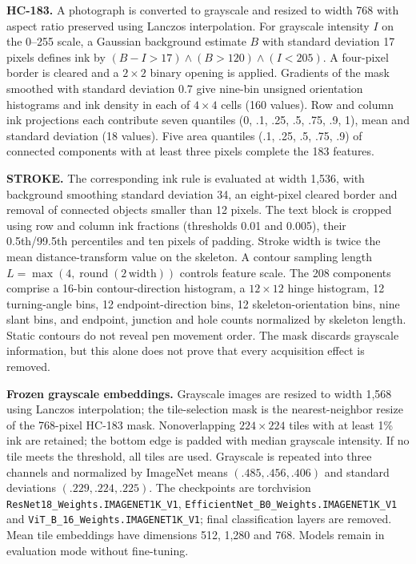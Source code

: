 \documentclass[ASNA,twocolumn]{USG}
\begin{document}
\textbf{HC-183.} A photograph is converted to grayscale and resized to width 768 with aspect ratio preserved using Lanczos interpolation. For grayscale intensity $I$ on the 0--255 scale, a Gaussian background estimate $B$ with standard deviation 17 pixels defines ink by $(B-I>17)\land(B>120)\land(I<205)$. A four-pixel border is cleared and a $2\times2$ binary opening is applied. Gradients of the mask smoothed with standard deviation 0.7 give nine-bin unsigned orientation histograms and ink density in each of $4\times4$ cells (160 values). Row and column ink projections each contribute seven quantiles (0, .1, .25, .5, .75, .9, 1), mean and standard deviation (18 values). Five area quantiles (.1, .25, .5, .75, .9) of connected components with at least three pixels complete the 183 features.

\textbf{STROKE.} The corresponding ink rule is evaluated at width 1,536, with background smoothing standard deviation 34, an eight-pixel cleared border and removal of connected objects smaller than 12 pixels. The text block is cropped using row and column ink fractions (thresholds 0.01 and 0.005), their 0.5th/99.5th percentiles and ten pixels of padding. Stroke width is twice the mean distance-transform value on the skeleton. A contour sampling length $L=\max(4,\operatorname{round}(2\,\mathrm{width}))$ controls feature scale. The 208 components comprise a 16-bin contour-direction histogram, a $12\times12$ hinge histogram, 12 turning-angle bins, 12 endpoint-direction bins, 12 skeleton-orientation bins, nine slant bins, and endpoint, junction and hole counts normalized by skeleton length. Static contours do not reveal pen movement order. The mask discards grayscale information, but this alone does not prove that every acquisition effect is removed.

\textbf{Frozen grayscale embeddings.} Grayscale images are resized to width 1,568 using Lanczos interpolation; the tile-selection mask is the nearest-neighbor resize of the 768-pixel HC-183 mask. Nonoverlapping $224\times224$ tiles with at least 1\% ink are retained; the bottom edge is padded with median grayscale intensity. If no tile meets the threshold, all tiles are used. Grayscale is repeated into three channels and normalized by ImageNet means $(.485,.456,.406)$ and standard deviations $(.229,.224,.225)$. The checkpoints are torchvision \texttt{ResNet18\_Weights.IMAGENET1K\_V1}, \texttt{EfficientNet\_B0\_Weights.IMAGENET1K\_V1} and \texttt{ViT\_B\_16\_Weights.IMAGENET1K\_V1}; final classification layers are removed. Mean tile embeddings have dimensions 512, 1,280 and 768. Models remain in evaluation mode without fine-tuning.
\end{document}
